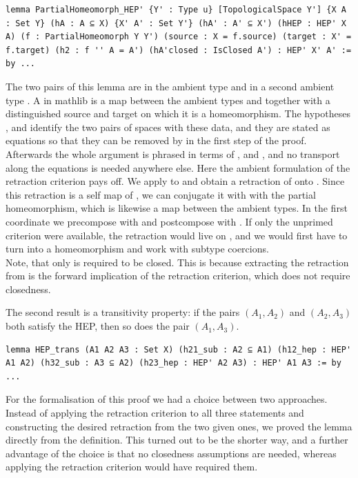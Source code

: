 \documentclass[11pt, a4paper, english]{article}
\theoremstyle{plain}
\theoremstyle{definition}
\theoremstyle{remark}
\numberwithin{equation}{section}
\numberwithin{theorem}{section}
\begin{document}
\begin{verbatim}
lemma PartialHomeomorph_HEP' {Y' : Type u} [TopologicalSpace Y'] {X A : Set Y} (hA : A ⊆ X) {X' A' : Set Y'} (hA' : A' ⊆ X') (hHEP : HEP' X A) (f : PartialHomeomorph Y Y') (source : X = f.source) (target : X' = f.target) (h2 : f '' A = A') (hA'closed : IsClosed A') : HEP' X' A' := by ...
\end{verbatim}
The two pairs of this lemma are  in the ambient type  and  in a second ambient type . A  in mathlib is a map between the ambient types  and  together with a distinguished source and target on which it is a homeomorphism. The hypotheses ,  and  identify the two pairs of spaces with these data, and they are stated as equations so that they can be removed by  in the first step of the proof. Afterwards the whole argument is phrased in terms of ,  and , and no transport along the equations is needed anywhere else. Here the ambient formulation of the retraction criterion pays off. We apply  to  and obtain a retraction of  onto . Since this retraction is  a self map of , we can conjugate it with with the partial homeomorphism, which is likewise a map between the ambient types. In the first coordinate we precompose with  and postcompose with . If only the unprimed criterion were available, the retraction would live on , and we would first have to turn  into a homeomorphism  and work with subtype coercions. \\
Note, that only  is required to be closed. This is because extracting the retraction from  is the forward implication of the retraction criterion, which does not require closedness.

The second result is a transitivity property: if the pairs $(A_1,A_2)$ and $(A_2,A_3)$ both satisfy the HEP, then so does the pair $(A_1,A_3)$.
\begin{verbatim}
lemma HEP_trans (A1 A2 A3 : Set X) (h21_sub : A2 ⊆ A1) (h12_hep : HEP' A1 A2) (h32_sub : A3 ⊆ A2) (h23_hep : HEP' A2 A3) : HEP' A1 A3 := by ...
\end{verbatim}

For the formalisation of this proof we had a choice between two approaches. Instead of applying the retraction criterion to all three  statements and constructing the desired retraction from the two given ones, we proved the lemma directly from the definition. This turned out to be the shorter way, and a further advantage of the choice is that no closedness assumptions are needed, whereas applying the retraction criterion would have required them. \\
\end{document}
